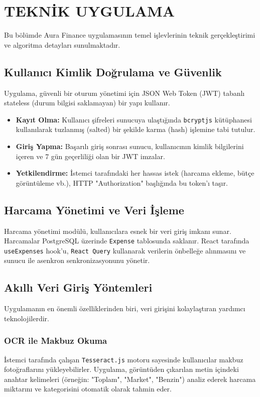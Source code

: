 \chapter{TEKNİK UYGULAMA}

Bu bölümde Aura Finance uygulamasının temel işlevlerinin teknik gerçekleştirimi ve algoritma detayları sunulmaktadır.

\section{Kullanıcı Kimlik Doğrulama ve Güvenlik}

Uygulama, güvenli bir oturum yönetimi için JSON Web Token (JWT) tabanlı stateless (durum bilgisi saklamayan) bir yapı kullanır.
\begin{itemize}
    \item \textbf{Kayıt Olma:} Kullanıcı şifreleri sunucuya ulaştığında \texttt{bcryptjs} kütüphanesi kullanılarak tuzlanmış (salted) bir şekilde karma (hash) işlemine tabi tutulur.
    \item \textbf{Giriş Yapma:} Başarılı giriş sonrası sunucu, kullanıcının kimlik bilgilerini içeren ve 7 gün geçerliliği olan bir JWT imzalar.
    \item \textbf{Yetkilendirme:} İstemci tarafındaki her hassas istek (harcama ekleme, bütçe görüntüleme vb.), HTTP "Authorization" başlığında bu token'ı taşır.
\end{itemize}

\section{Harcama Yönetimi ve Veri İşleme}

Harcama yönetimi modülü, kullanıcılara esnek bir veri giriş imkanı sunar. Harcamalar PostgreSQL üzerinde \texttt{Expense} tablosunda saklanır. React tarafında \texttt{useExpenses} hook'u, \texttt{React Query} kullanarak verilerin önbelleğe alınmasını ve sunucu ile asenkron senkronizasyonunu yönetir.

\section{Akıllı Veri Giriş Yöntemleri}

Uygulamanın en önemli özelliklerinden biri, veri girişini kolaylaştıran yardımcı teknolojilerdir.

\subsection{OCR ile Makbuz Okuma}
İstemci tarafında çalışan \texttt{Tesseract.js} motoru sayesinde kullanıcılar makbuz fotoğraflarını yükleyebilirler. Uygulama, görüntüden çıkarılan metin içindeki anahtar kelimeleri (örneğin: "Toplam", "Market", "Benzin") analiz ederek harcama miktarını ve kategorisini otomatik olarak tahmin eder.

